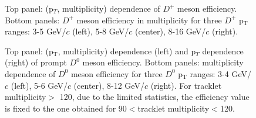 \begin{figure}[h]
	\centering
	\caption{Top panel: (p$_T$, multiplicity) dependence of $D^+$ meson efficiency. Bottom panels: $D^+$ meson efficiency in multiplicity for three $D^+$ p$_\mathrm{T}$ranges: 3-5 GeV/$c$ (left), 5-8 GeV/$c$ (center), 8-16 GeV/$c$ (right).}
	\label{fig:dpluseff}	
\end{figure}

\begin{figure}[!htp]
	\centering
	\caption{Top panel: (p$_\mathrm{T}$, multiplicity) dependence (left) and p$_T$ dependence (right) of prompt $D^0$ meson efficiency. Bottom panels: multiplicity dependence of $D^0$ meson efficiency for three $D^0$ p$_\mathrm{T}$ ranges: 3-4 GeV/$c$ (left), 5-6 GeV/$c$ (center), 8-12 GeV/$c$ (right). For tracklet multiplicity$>$ 120, due to the limited statistics, the efficiency value is fixed to the one obtained for 90$<$tracklet multiplicity$<$120.}
	\label{fig:d0eff}	
\end{figure}
\newpage 
